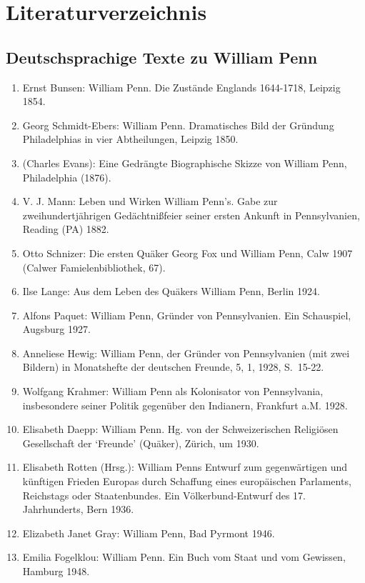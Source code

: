 \chapter{Literaturverzeichnis}


\section{Deutschsprachige Texte zu William Penn}

\begin{enumerate}
\item  Ernst Bunsen: William Penn. Die Zustände Englands 1644-1718, Leipzig
1854.
 \item Georg Schmidt-Ebers: William Penn. Dramatisches Bild der Gründung
Philadelphias in vier Abtheilungen, Leipzig 1850.
 \item (Charles Evans): Eine Gedrängte Biographische Skizze von William Penn,
Philadelphia (1876).
 \item V. J. Mann: Leben und Wirken William Penn’s. Gabe zur
zweihundertjährigen
Gedächtnißfeier seiner ersten Ankunft in Pennsylvanien, Reading (PA) 1882.
 \item Otto Schnizer:
Die ersten Quäker Georg Fox und William Penn,
Calw 1907 (Calwer Famielenbibliothek, 67).
 \item Ilse Lange: Aus dem Leben des Quäkers William Penn, Berlin 1924.
 \item Alfons Paquet: William Penn, Gründer von Pennsylvanien. Ein Schauspiel,
Augsburg 1927.
 \item Anneliese Hewig: William Penn, der Gründer von Pennsylvanien
(mit zwei Bildern) in Monatshefte der deutschen Freunde, 5, 1, 1928, S.~15-22.
 \item Wolfgang Krahmer: William Penn als Kolonisator von Pennsylvania,
insbesondere seiner Politik gegenüber den Indianern, Frankfurt a.M. 1928.
 \item Elisabeth Daepp: William Penn. Hg. von der Schweizerischen Religiösen
Gesellschaft der ‘Freunde’ (Quäker), Zürich, um 1930.
 \item Elisabeth Rotten (Hrsg.): William Penns Entwurf zum gegenwärtigen und
künftigen
Frieden Europas durch Schaffung eines europäischen Parlaments,
Reichstags oder Staatenbundes. Ein Völkerbund-Entwurf des 17. Jahrhunderts,
Bern 1936.
 \item Elizabeth Janet Gray: William Penn, Bad Pyrmont 1946.
 \item Emilia Fogelklou: William Penn. Ein Buch vom Staat und vom Gewissen,
Hamburg 1948.

\end{enumerate}
